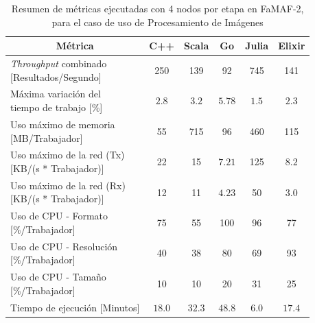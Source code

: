 \documentclass[11pt]{article}
\providecommand{\row}[1]{\parbox{150pt}{\setlength{\baselineskip}{0.2\baselineskip}\strut#1\strut}}
\newcommand{\english}[1]{\textit{#1}}
\begin{document}
\begin{table}[H]
\centering
\begin{tabular}{|l|c|c|c|c|c|}
\hline
\multicolumn{1}{|c|}{Métrica} & C++ & Scala & Go & Julia & Elixir \\ \hline
\row{\english{Throughput} combinado\\ {[}Resultados/Segundo{]}} & 250 & 139 & 92 & 745 & 141 \\ \hline
\row{Máxima variación del \\ tiempo de trabajo {[}\%{]}} & $2.8$ & $3.2$ & $5.78$ & $1.5$ & $2.3$ \\ \hline
\row{Uso máximo de memoria \\ {[}MB/Trabajador{]}} & 55 & 715 & 96 & 460 & 115 \\ \hline
\row{Uso máximo de la red (Tx)\\ {[}KB/(s * Trabajador){]}} & 22 & 15 & $7.21$ & 125 & $8.2$ \\ \hline
\row{Uso máximo de la red (Rx)\\ {[}KB/(s * Trabajador){]}} & 12 & 11 & $4.23$ & 50 & $3.0$ \\ \hline
\row{Uso de CPU - Formato \\ {[}\%/Trabajador{]}} & 75 & 55 & 100 & 96 & 77 \\ \hline
\row{Uso de CPU - Resolución \\ {[}\%/Trabajador{]}} & 40 & 38 & 80 & 69 & 93 \\ \hline
\row{Uso de CPU - Tamaño \\ {[}\%/Trabajador{]}} & 10 & 10 & 20 & 31 & 25 \\ \hline
Tiempo de ejecución {[}Minutos{]} & $18.0$ & $32.3$ & $48.8$ & $6.0$ & $17.4$ \\ \hline
\end{tabular}
\caption{Resumen de métricas ejecutadas con 4 nodos por etapa en FaMAF-2, para el caso de uso de Procesamiento de Imágenes}
\label{tab:ip:4_workers_famaf_2}
\end{table}
\end{document}
